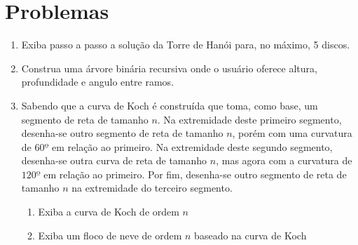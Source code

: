 \section*{Problemas}
\begin{enumerate}
\item
  Exiba passo a passo a solução da Torre de Hanói para, no máximo, 5 discos.
  \label{ex:cap04_ex1}

\item
  Construa uma árvore binária recursiva onde o usuário oferece altura, profundidade e angulo entre ramos.
  \label{ex:cap04_ex2}

\item
  Sabendo que a curva de Koch é construída que toma, como base, um segmento de reta de tamanho $n$. Na extremidade deste primeiro segmento, desenha-se outro segmento de reta de tamanho $n$, porém com uma curvatura de $60º$ em relação ao primeiro. Na extremidade deste segundo segmento, desenha-se outra curva de reta de tamanho $n$, mas agora com a curvatura de $120º$ em relação ao primeiro. Por fim, desenha-se outro segmento de reta de tamanho $n$ na extremidade do terceiro segmento.
    \begin{enumerate}
      \item Exiba a curva de Koch de ordem $n$
        \label{ex:cap04_ex3a}
      \item Exiba um floco de neve de ordem $n$ baseado na curva de Koch
        \label{ex:cap04_ex3b}
    \end{enumerate}
  \label{ex:cap04_ex3}


\end{enumerate}
